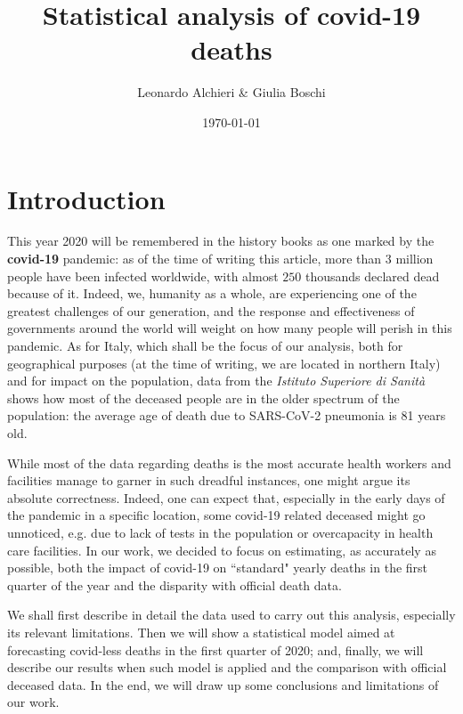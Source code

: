\documentclass[11pt,a4paper,final]{paper}
\author{Leonardo Alchieri \& Giulia Boschi}
\title{Statistical analysis of covid-19 deaths}
\date{\today}
\begin{document}
\begin{titlepage}
\maketitle
\end{titlepage}
\tableofcontents
\clearpage

\section{Introduction}\label{sec:intro}

This year 2020 will be remembered in the history books as one marked by the \textbf{covid-19} pandemic: as of the time of writing this article, more than 3 million people have been infected worldwide, with almost $250$ thousands declared dead because of it.  Indeed, we, humanity as a whole, are experiencing one of the greatest challenges of our generation, and the response and effectiveness of governments around the world will weight on how many people will perish in this pandemic. As for Italy, which shall be the focus of our analysis, both for geographical purposes (at the time of writing, we are located in northern Italy) and for impact on the population, data from the \textit{Istituto Superiore di Sanità} shows how most of the deceased people are in the older spectrum of the population: the average age of death due to SARS-CoV-2 pneumonia is 81 years old. \cite{remuzzi2020covid} 

While most of the data regarding deaths is the most accurate health workers and facilities manage to garner in such dreadful instances, one might argue its absolute correctness. Indeed, one can expect that, especially in the early days of the pandemic in a specific location, some covid-19 related deceased might go unnoticed, e.g. due to lack of tests in the population or overcapacity in health care facilities. In our work, we decided to focus on estimating, as accurately as possible, both the impact of covid-19 on ``standard" yearly deaths in the first quarter of the year and the disparity with official death data. 

We shall first describe in detail the data used to carry out this analysis, especially its relevant limitations. Then we will show a statistical model aimed at forecasting covid-less deaths in the first quarter of 2020; and, finally, we will describe our results when such model is applied and the comparison with official deceased data. In the end, we will draw up some conclusions and limitations of our work.
\end{document}
